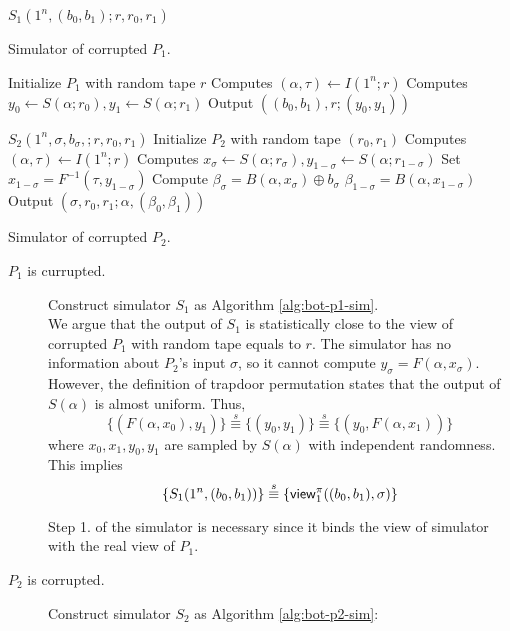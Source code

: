 \begin{algorithm}
$S_1(1^n,(b_0,b_1);r,r_0,r_1)$\;
\caption{Simulator of corrupted $P_1$.} \label{alg:bot-p1-sim}
Initialize $P_1$ with random tape $r$\;
Computes $(\alpha,\tau)\gets I(1^n;r)$\;
Computes $y_0\gets S(\alpha;r_0), y_1\gets S(\alpha;r_1)$\;
Output $((b_0,b_1),r;(y_0,y_1))$\;
\end{algorithm}

\begin{algorithm}
$S_2(1^n,\sigma,b_\sigma,;r,r_0,r_1)$\;
Initialize $P_2$ with random tape $(r_0,r_1)$\;
Computes $(\alpha,\tau)\gets I(1^n;r)$\;
Computes $x_\sigma\gets S(\alpha;r_\sigma), y_{1-\sigma}\gets S(\alpha;r_{1-\sigma})$\;
Set $x_{1-\sigma}=F^{-1}(\tau,y_{1-\sigma})$\;
Compute $\beta_\sigma=B(\alpha,x_\sigma)\oplus b_\sigma$\;
$\beta_{1-\sigma}=B(\alpha,x_{1-\sigma})$\;
Output $(\sigma,r_0,r_1;\alpha,(\beta_0,\beta_1))$\;

\caption{Simulator of corrupted $P_2$.} \label{alg:bot-p2-sim}
\end{algorithm}

\begin{description}
\item[$P_1$ is currupted.] Construct simulator $S_1$ as Algorithm \ref{alg:bot-p1-sim}. \\
We argue that the output of $S_1$ is statistically close to the view of corrupted $P_1$ with random tape equals to $r$. The simulator has no information about $P_2$'s input $\sigma$, so it cannot compute $y_\sigma=F(\alpha,x_\sigma)$. However, the definition of trapdoor permutation states that the output of $S(\alpha)$ is almost uniform. Thus,
    $$\{(F(\alpha,x_0),y_1)\}\stackrel{s}{\equiv}\{(y_0,y_1)\}\stackrel{s}{\equiv}\{(y_0,F(\alpha,x_1))\}$$
where $x_0,x_1,y_0,y_1$ are sampled by $S(\alpha)$ with independent randomness. This implies
$$\{S_1(1^n,(b_0,b_1))\}\stackrel{s}{\equiv}\{{\sf view}^\pi_1((b_0,b_1),\sigma)\}$$
\begin{remark}
Step 1. of the simulator is necessary since it binds the view of simulator with the real view of $P_1$.
\end{remark}
\item[$P_2$ is corrupted.] Construct simulator $S_2$ as Algorithm \ref{alg:bot-p2-sim}:

\end{description}
\nocite{*} 